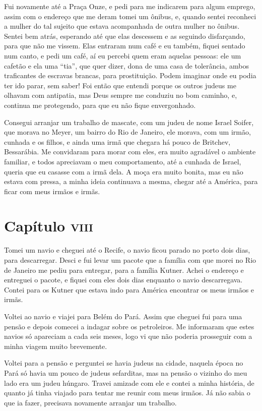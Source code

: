 Fui novamente até a Praça Onze, e pedi para me indicarem para algum
emprego, assim com o endereço que me deram tomei um ônibus, e, quando
sentei reconheci a mulher do tal sujeito que estava acompanhada de outra
mulher no ônibus. Sentei bem atrás, esperando até que elas descessem e
as seguindo disfarçando, para que não me vissem. Elas entraram num café
e eu também, fiquei sentado num canto, e pedi um café, aí eu percebi
quem eram aquelas pessoas: ele um cafetão e ela uma ``tia'', que quer
dizer, dona de uma casa de tolerância, ambos traficantes de escravas
brancas, para prostituição. Podem imaginar onde eu podia ter ido parar,
sem saber! Foi então que entendi porque os outros judeus me olhavam com
antipatia, mas Deus sempre me conduziu no bom caminho, e, continua me
protegendo, para que eu não fique envergonhado.

Consegui arranjar um trabalho de mascate, com um judeu de nome Israel
Soifer, que morava no Meyer, um bairro do Rio de Janeiro, ele morava,
com um irmão, cunhada e os filhos, e ainda uma irmã que chegara há pouco
de Britchev, Bessarábia. Me convidaram para morar com eles, era muito
agradável o ambiente familiar, e todos apreciavam o meu comportamento,
até a cunhada de Israel, queria que eu casasse com a irmã dela. A moça
era muito bonita, mas eu não estava com pressa, a minha ideia continuava
a mesma, chegar até a América, para ficar com meus irmãos e irmãs.

\chapter{Capítulo \textsc{viii}}

Tomei um navio e cheguei até o Recife, o navio ficou parado no porto
dois dias, para descarregar. Desci e fui levar um pacote que a família
com que morei no Rio de Janeiro me pediu para entregar, para a família
Kutner. Achei o endereço e entreguei o pacote, e fiquei com eles dois
dias enquanto o navio descarregava. Contei para os Kutner que estava
indo para América encontrar os meus irmãos e irmãs.

Voltei ao navio e viajei para Belém do Pará. Assim que cheguei fui para
uma pensão e depois comecei a indagar sobre os petroleiros. Me
informaram que estes navios só apareciam a cada seis meses, logo vi que
não poderia prosseguir com a minha viagem muito brevemente.

Voltei para a pensão e perguntei se havia judeus na cidade, naquela
época no Pará só havia um pouco de judeus sefarditas, mas na pensão o
vizinho do meu lado era um judeu húngaro. Travei amizade com ele e
contei a minha história, de quanto já tinha viajado para tentar me
reunir com meus irmãos. Já não sabia o que ia fazer, precisava novamente
arranjar um trabalho.

